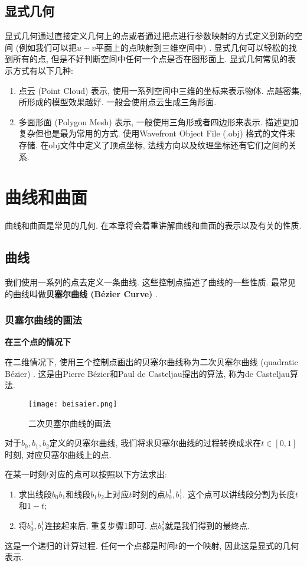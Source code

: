 \documentclass[openany]{progbookcn}
\begin{document}
\section{显式几何}
显式几何通过直接定义几何上的点或者通过把点进行参数映射的方式定义到新的空间 (例如我们可以把$u-v$平面上的点映射到三维空间中) . 显式几何可以轻松的找到所有的点, 但是不好判断空间中任何一个点是否在图形面上. 显式几何常见的表示方式有以下几种: 
\begin{enumerate}
	\item 点云 (Point Cloud) 表示, 使用一系列空间中三维的坐标来表示物体. 点越密集, 所形成的模型效果越好. 一般会使用点云生成三角形面. 
	\item 多面形面 (Polygon Mesh) 表示, 一般使用三角形或者四边形来表示. 描述更加复杂但也是最为常用的方式. 使用Wavefront Object File (.obj) 格式的文件来存储. 在obj文件中定义了顶点坐标, 法线方向以及纹理坐标还有它们之间的关系. 
\end{enumerate}

\chapter{曲线和曲面}
曲线和曲面是常见的几何. 在本章将会着重讲解曲线和曲面的表示以及有关的性质. 

\section{曲线}
我们使用一系列的点去定义一条曲线. 这些控制点描述了曲线的一些性质. 最常见的曲线叫做\textbf{贝塞尔曲线 (B\'ezier Curve) }. 
\subsection{贝塞尔曲线的画法}
\textbf{在三个点的情况下}

在二维情况下, 使用三个控制点画出的贝塞尔曲线称为二次贝塞尔曲线 (quadratic B\'ezier) . 这是由Pierre B\'ezier和Paul de Casteljau提出的算法, 称为de Casteljau算法. 

\begin{figure}[H]
	\centering
	\texttt{[image: beisaier.png]}
	\caption{二次贝塞尔曲线的画法}
	\label{fig:beisaier}
\end{figure}
对于$b_0,b_1,b_2$定义的贝塞尔曲线, 我们将求贝塞尔曲线的过程转换成求在$t\in [0,1]$时刻, 对应贝塞尔曲线上的点. 

在某一时刻$t$对应的点可以按照以下方法求出: 
\begin{enumerate}
	\item 求出线段$b_0b_1$和线段$b_1b_2$上对应$t$时刻的点$b_0^1,b_1^1$. 这个点可以讲线段分割为长度$t$和$1-t$; 
	\item 将$b_0^1,b_1^1$连接起来后, 重复步骤1即可. 点$b_0^2$就是我们得到的最终点. 
\end{enumerate}
这是一个递归的计算过程. 任何一个点都是时间$t$的一个映射, 因此这是显式的几何表示. 
\end{document}

